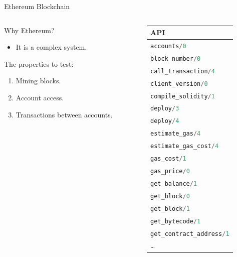 \documentclass[aspectratio=169, 10pt, handout]{beamer}
\begin{document}
\begin{frame}[label={sec:org16bc210},fragile]{Ethereum Blockchain}
 \begin{columns}
\begin{column}{0.48\columnwidth}
Why Ethereum?
\begin{itemize}
\item It is a complex system.
\end{itemize}

\vspace{10pt}  

The properties to test:
\onslide<+->
\begin{enumerate}
\item Mining blocks.
\onslide<+->
\item Account access.
\onslide<+->
\item Transactions between accounts.
\end{enumerate}
\end{column}

\begin{column}{0.48\columnwidth}
\begin{center}
\begin{tabular}{l}
API\\
\hline
\lstinline[language=elixir, style=display]~accounts/0~\\
\lstinline[language=elixir, style=display]~block_number/0~\\
\lstinline[language=elixir, style=display]~call_transaction/4~\\
\lstinline[language=elixir, style=display]~client_version/0~\\
\lstinline[language=elixir, style=display]~compile_solidity/1~\\
\lstinline[language=elixir, style=display]~deploy/3~\\
\lstinline[language=elixir, style=display]~deploy/4~\\
\lstinline[language=elixir, style=display]~estimate_gas/4~\\
\lstinline[language=elixir, style=display]~estimate_gas_cost/4~\\
\lstinline[language=elixir, style=display]~gas_cost/1~\\
\lstinline[language=elixir, style=display]~gas_price/0~\\
\lstinline[language=elixir, style=display]~get_balance/1~\\
\lstinline[language=elixir, style=display]~get_block/0~\\
\lstinline[language=elixir, style=display]~get_block/1~\\
\lstinline[language=elixir, style=display]~get_bytecode/1~\\
\lstinline[language=elixir, style=display]~get_contract_address/1~\\
\ldots{}\\
\end{tabular}
\end{center}
\end{column}
\end{columns}
\end{frame}
\end{document}
